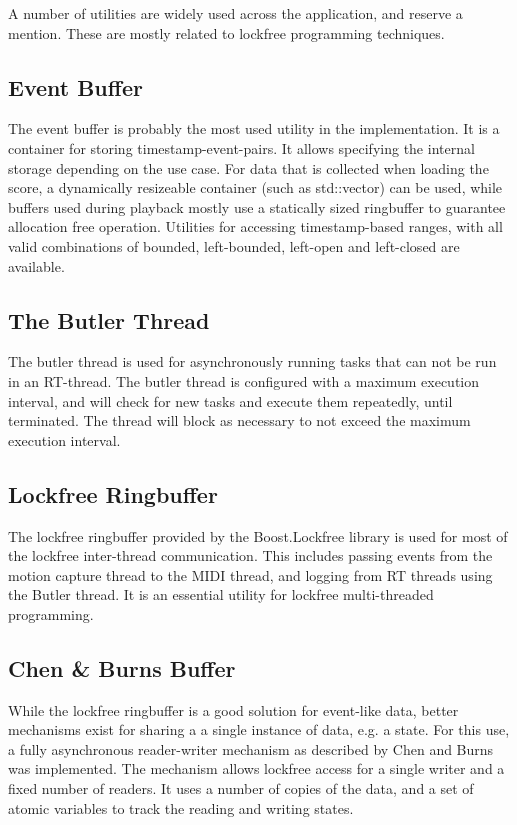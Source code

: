 A number of utilities are widely used across the application,
and reserve a mention.
These are mostly related to lockfree programming techniques.

\subsection{Event Buffer}

The event buffer is probably the most used utility in the implementation.
It is a container for storing timestamp-event-pairs.
It allows specifying the internal storage depending on the use case.
For data that is collected when loading the score,
a dynamically resizeable container (such as std::vector) can be used,
while buffers used during playback mostly use a statically sized ringbuffer
to guarantee allocation free operation.
Utilities for accessing timestamp-based ranges,
with all valid combinations of
bounded, left-bounded, left-open and left-closed are available.

\subsection{The Butler Thread}

The butler thread is used for asynchronously running
tasks that can not be run in an RT-thread.
The butler thread is configured with a maximum execution interval,
and will check for new tasks and execute them repeatedly,
until terminated.
The thread will block as necessary to not exceed the
maximum execution interval.

\subsection{Lockfree Ringbuffer}

The lockfree ringbuffer provided by the Boost.Lockfree library \cite{required?}
is used for most of the lockfree inter-thread communication.
This includes passing events from the motion capture thread
to the MIDI thread, and logging from RT threads using the Butler thread.
It is an essential utility for lockfree multi-threaded programming.

\subsection{Chen \& Burns Buffer}

While the lockfree ringbuffer is a good solution
for event-like data,
better mechanisms exist for sharing a a single
instance of data, e.g. a state. 
For this use, a fully asynchronous reader-writer mechanism
as described by Chen and Burns \cite{Chen97} was implemented.
The mechanism allows lockfree access for
a single writer and a fixed number of readers.
It uses a number of copies of the data,
and a set of atomic variables to track
the reading and writing states.

